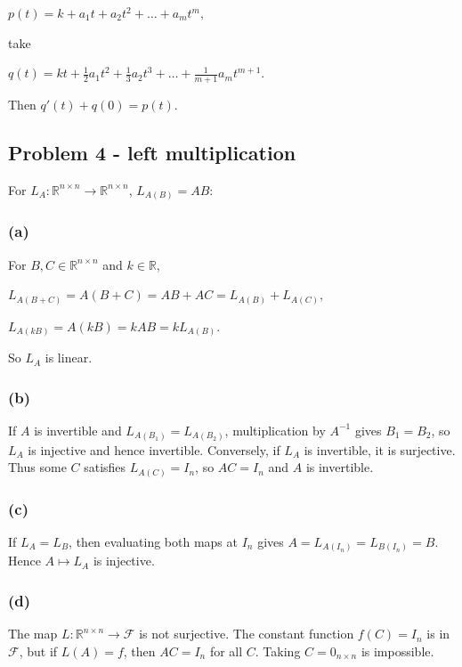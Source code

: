 \(p(t) = k + a_{1}t + a_{2}t^{2} + \ldots + a_{m}t^{m},\)

take

\(q(t) = kt + \frac{1}{2}a_{1}t^{2} + \frac{1}{3}a_{2}t^{3} + \ldots + \frac{1}{m + 1}a_{m}t^{m + 1}.\)

Then \(q'(t) + q(0) = p(t)\).

\subsection{Problem 4 - left multiplication}

For \(L_{A}:\mathbb{R}^{n \times n}\rightarrow\mathbb{R}^{n \times n}\), \(L_{A{(B)}} = AB\):

\subsubsection{(a)}

For \(B,C \in \mathbb{R}^{n \times n}\) and \(k \in \mathbb{R}\),

\(L_{A{({B + C})}} = A\left( {B + C} \right) = AB + AC = L_{A{(B)}} + L_{A{(C)}},\)

\(L_{A{({kB})}} = A\left( {kB} \right) = kAB = kL_{A{(B)}}.\)

So \(L_{A}\) is linear.

\subsubsection{(b)}

If \(A\) is invertible and \(L_{A{(B_{1})}} = L_{A{(B_{2})}}\), multiplication by \(A^{- 1}\) gives \(B_{1} = B_{2}\), so \(L_{A}\) is injective and hence invertible. Conversely, if \(L_{A}\) is invertible, it is surjective. Thus some \(C\) satisfies \(L_{A{(C)}} = I_{n}\), so \(AC = I_{n}\) and \(A\) is invertible.

\subsubsection{(c)}

If \(L_{A} = L_{B}\), then evaluating both maps at \(I_{n}\) gives \(A = L_{A{(I_{n})}} = L_{B{(I_{n})}} = B\). Hence \(A\mapsto L_{A}\) is injective.

\subsubsection{(d)}

The map \(L:\mathbb{R}^{n \times n}\rightarrow\mathcal{F}\) is not surjective. The constant function \(f(C) = I_{n}\) is in \(\mathcal{F}\), but if \(L(A) = f\), then \(AC = I_{n}\) for all \(C\). Taking \(C = 0_{n \times n}\) is impossible.

